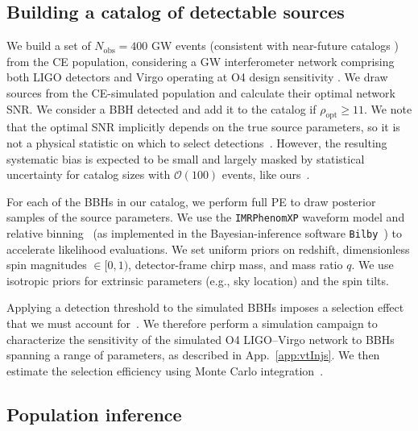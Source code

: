 \begin{refsection}
\subsection{Building a catalog of detectable sources}\label{sec: nlth detectable catalog}

We build a set of ${N_\mathrm{obs} = 400}$ \ac{GW} events (consistent with near-future catalogs \citep{Capote:2024rmo}) from the \ac{CE} population, considering a \ac{GW} interferometer network comprising both LIGO detectors and Virgo operating at O4 design sensitivity \citep{KAGRA:2013rdx, OReilly:2022}. We draw sources from the \ac{CE}-simulated population and calculate their optimal network \ac{SNR}. We consider a \ac{BBH} detected and add it to the catalog if $\rho_{\mathrm{opt}} \geq 11$. We note that the optimal \ac{SNR} implicitly depends on the true source parameters, so it is not a physical statistic on which to select detections~\citep{Essick:2023upv}. However, the resulting systematic bias is expected to be small and largely masked by statistical uncertainty for catalog sizes with $\mathcal{O}(100)$ events, like ours~\citep{Heinzel:2024jlc}.

For each of the \acp{BBH} in our catalog, we perform full \acf{PE} to draw posterior samples of the source parameters. We use the \texttt{IMRPhenomXP} waveform model \citep{Pratten:2020ceb} and relative binning~\citep{Cornish:2010kf, Cornish:2021lje, Zackay:2018qdy,krishna2023:bug} (as implemented in the Bayesian-inference software \texttt{Bilby}~\citep{Ashton:2018jfp}) to accelerate likelihood evaluations. We set uniform priors on redshift, dimensionless spin magnitudes $\in[0,1)$, detector-frame chirp mass, and mass ratio $q$. We use isotropic priors for extrinsic parameters (e.g., sky location) and the spin tilts.

Applying a detection threshold to the simulated \acp{BBH} imposes a selection effect that we must account for~\citep{Thrane:2018qnx, Loredo:2004nn, Mandel:2018mve}. We therefore perform a simulation campaign to characterize the sensitivity of the simulated \ac{O4} LIGO--Virgo network to \acp{BBH} spanning a range of parameters, as described in App.~\ref{app:vtInjs}. We then estimate the selection efficiency using Monte Carlo integration~\citep{Tiwari:2017ndi,Farr_2019}.

\subsection{Population inference}
\label{sec: nlth pop inference}


\end{refsection}

